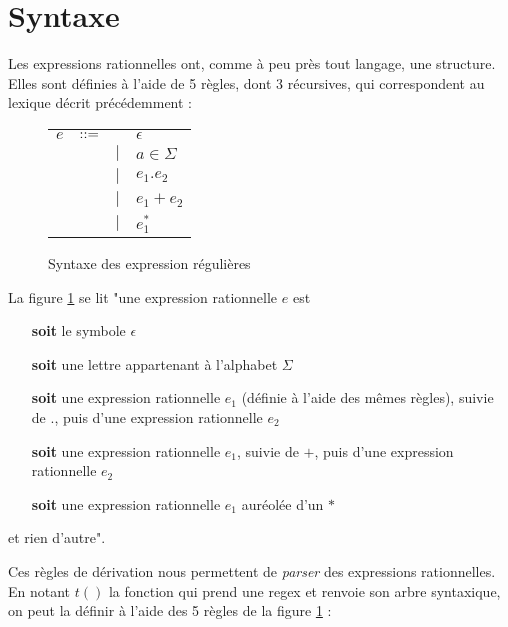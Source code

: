\section{Syntaxe}


Les expressions rationnelles ont, comme à peu près tout langage, une structure. Elles sont définies à l'aide de 5 règles, dont 3 récursives, qui correspondent au lexique décrit précédemment : 

\begin{figure}[h]
    \centering
\begin{tabular}{cccl}
$e$ & $\textcolor{black}{::=}$ & & $\epsilon$\\
& & $|$&  $a \in \Sigma$\\
& & $|$&  $e_1.e_2$\\
& & $|$&  $e_1+e_2$\\
& & $|$&  $e_1^*$\\
\end{tabular}
\caption{Syntaxe des expression régulières}
    \label{resynfig}
\end{figure}

La figure \ref{resynfig} se lit "une expression rationnelle $e$ est 

\begin{itemize}
    \item[\textbf{soit}] le symbole $\epsilon$
    \item[\textbf{soit}] une lettre appartenant à l'alphabet $\Sigma$
    \item[\textbf{soit}] une expression rationnelle $e_1$ (définie à l'aide des mêmes règles), suivie de $.$, puis d'une expression rationnelle $e_2$
    \item[\textbf{soit}] une expression rationnelle $e_1$, suivie de $+$, puis d'une expression rationnelle $e_2$
    \item[\textbf{soit}] une expression rationnelle $e_1$ auréolée d'un $*$
\end{itemize}

et rien d'autre".

Ces règles de dérivation nous permettent de \textit{parser} des expressions rationnelles. En notant $t()$ la fonction qui prend une regex et renvoie son arbre syntaxique, on peut la définir à l'aide des 5 règles de la figure \ref{resynfig} :


